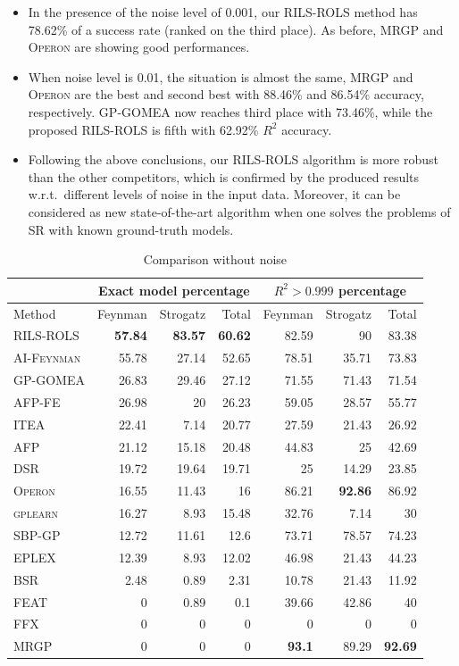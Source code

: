 \documentclass[a4paper,12pt]{elsarticle}
\begin{document}
\begin{itemize}
	\item  In the presence of the noise level of 0.001, our \textsc{RILS-ROLS} method has 78.62\% of a success rate (ranked on the third place).  As before, \textsc{MRGP} and \textsc{Operon} are showing good performances. 
	
	\item   When noise level is 0.01, the situation is almost the same, \textsc{MRGP} and \textsc{Operon} are the best and second best with 88.46\% and 86.54\% accuracy, respectively. \textsc{GP-GOMEA} now reaches third place with 73.46\%, while the proposed \textsc{RILS-ROLS} is fifth with 62.92\% $R^2$ accuracy.
	
	\item Following the above conclusions, our \textsc{RILS}-\textsc{ROLS} algorithm is more robust than the other competitors, which is confirmed by the produced results w.r.t.\ different levels of noise in the input data. Moreover, it can be considered as new state-of-the-art algorithm when one solves the problems of SR with known ground-truth models. 
	
\end{itemize}

\begin{table}[!htb]
	\caption{Comparison without noise}\label{tab:comp_noise0}
	\centering
	\begin{tabular}{l|rrr|rrr} \hline
		& \multicolumn{3}{c|}{Exact model percentage} & \multicolumn{3}{c}{$R^2 > 0.999$ percentage}\\ \hline
		Method & Feynman & Strogatz & Total & Feynman & Strogatz & Total \\ \hline
		\textsc{RILS-ROLS}&\bf{57.84}&\bf{83.57}&\bf{60.62}&82.59&90&83.38\\
		\textsc{AI-Feynman}&55.78&27.14&52.65&78.51&35.71&73.83\\
		\textsc{GP-GOMEA}&26.83&29.46&27.12&71.55&71.43&71.54\\
		\textsc{AFP-FE}&26.98&20&26.23&59.05&28.57&55.77\\
		\textsc{ITEA}&22.41&7.14&20.77&27.59&21.43&26.92\\
		\textsc{AFP}&21.12&15.18&20.48&44.83&25&42.69\\
		\textsc{DSR}&19.72&19.64&19.71&25&14.29&23.85\\
		\textsc{Operon}&16.55&11.43&16&86.21&\bf{92.86}&86.92\\
		\textsc{gplearn}&16.27&8.93&15.48&32.76&7.14&30\\
		\textsc{SBP-GP}&12.72&11.61&12.6&73.71&78.57&74.23\\
		\textsc{EPLEX}&12.39&8.93&12.02&46.98&21.43&44.23\\
		\textsc{BSR}&2.48&0.89&2.31&10.78&21.43&11.92\\
		\textsc{FEAT}&0&0.89&0.1&39.66&42.86&40\\
		\textsc{FFX}&0&0&0&0&0&0\\
		\textsc{MRGP}&0&0&0&\bf{93.1}&89.29&\bf{92.69}\\
		\hline
	\end{tabular}
\end{table}
\end{document}
